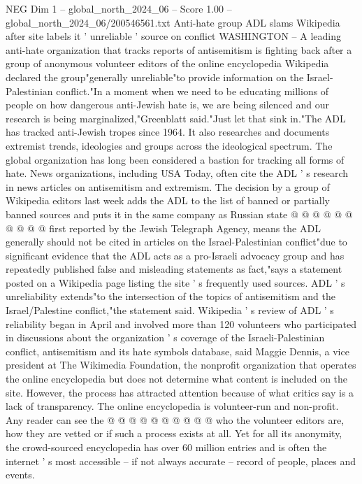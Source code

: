 \begin{textsample}{NEG Dim 1 – global\_north\_2024\_06 – Score 1.00 – global\_north\_2024\_06/200546561.txt}  \label{ex:f1_neg_212}
Anti-hate group ADL slams Wikipedia after site labels it ' unreliable ' source on conflict WASHINGTON -- A leading anti-hate organization that tracks reports of antisemitism is fighting back after a group of anonymous volunteer editors of the online encyclopedia Wikipedia declared the group"generally unreliable"to provide information on the Israel-Palestinian conflict."In a moment when we need to be educating millions of people on how dangerous anti-Jewish hate is, we are being silenced and our research is being marginalized,"Greenblatt said."Just let that sink in."The ADL has tracked anti-Jewish tropes since 1964.
It also researches and documents extremist trends, ideologies and groups across the ideological spectrum.
The global organization has long been considered a bastion for tracking all forms of hate.
News organizations, including USA Today, often cite the ADL ' s research in news articles on antisemitism and extremism.
The decision by a group of Wikipedia editors last week adds the ADL to the list of banned or partially banned sources and puts it in the same company as Russian state @ @ @ @ @ @ @ @ @ @ first reported by the Jewish Telegraph Agency, means the ADL generally should not be cited in articles on the Israel-Palestinian conflict"due to significant evidence that the ADL acts as a pro-Israeli advocacy group and has repeatedly published false and misleading statements as fact,"says a statement posted on a Wikipedia page listing the site ' s frequently used sources.
ADL ' s unreliability extends"to the intersection of the topics of antisemitism and the Israel/Palestine conflict,"the statement said.
Wikipedia ' s review of ADL ' s reliability began in April and involved more than 120 volunteers who participated in discussions about the organization ' s coverage of the Israeli-Palestinian conflict, antisemitism and its hate symbols database, said Maggie Dennis, a vice president at The Wikimedia Foundation, the nonprofit organization that operates the online encyclopedia but does not determine what content is included on the site.
However, the process has attracted attention because of what critics say is a lack of transparency.
The online encyclopedia is volunteer-run and non-profit.
Any reader can see the @ @ @ @ @ @ @ @ @ @ who the volunteer editors are, how they are vetted or if such a process exists at all.
Yet for all its anonymity, the crowd-sourced encyclopedia has over 60 million entries and is often the internet ' s most accessible -- if not always accurate -- record of people, places and events.

\end{textsample}
